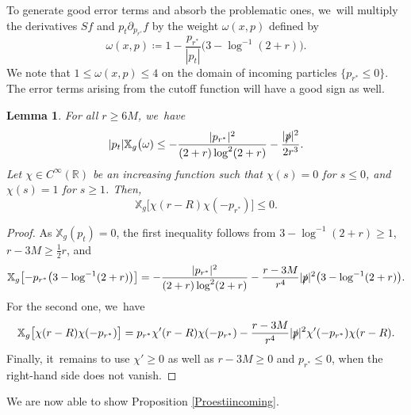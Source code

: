 \documentclass[10pt]{amsart}
\theoremstyle{plain}
\newtheorem{lemma}[proposition]{Lemma}
\theoremstyle{definition}
\newcommand\R{{\mathbb{R}}}
\newcommand\T{{\mathbb{X}}}
\begin{document}
To generate good error terms and absorb the problematic ones, we~will multiply the derivatives $Sf$ and $p_t \partial_{p_{r^*}}f$ by the weight $\omega(x,p)$ defined by
\begin{equation}\label{eq:defomegafaraway}
\omega(x,p)\coloneqq 1-\frac{p_{r^*}}{|p_t|}\bigl(3- \log^{-1}(2+r) \bigr).
\end{equation}
We note that $1 \leq \omega(x,p) \leq 4$ on the domain of incoming particles $\{ p_{r^*} \leq 0 \}$. The error terms arising from the cutoff function will have a good sign as well.

\begin{lemma}\label{Lemtruc}
For all $r \geq 6M$, we~have
\[
|p_t| \T_g \bigl(\omega)\leq -\frac{|p_{r^*}|^2}{(2+r) \log^2(2+r)}-\frac{|\slashed{p}|^2}{2r^3}.
\]
Let $ \chi \in C^\infty (\R)$ be an increasing function such that $\chi (s)=0$ for $s \leq 0$, and $\chi(s) =1$ for $s \geq 1$. Then,
\[
\T_g \bigl[ \chi (r-R)\chi (-p_{r^*}) \bigr] \leq 0.
\]
\end{lemma}

\begin{proof}
As $\T_g(p_t)=0$, the first inequality follows from $3- \log^{-1}(2+r) \geq 1$, $r-3M \geq \frac{1}{2}r$, and
\[
\T_g \bigl[ -p_{r^*} \bigl(3- \log^{-1}(2+r) \bigr) \bigr]= -\frac{|p_{r^*}|^2}{(2+r) \log^2(2+r)}-\frac{r-3M}{r^4}|\slashed{p}|^2 \bigl(3- \log^{-1}(2+r)\bigr).
\]
For the second one, we~have
\[
\T_g \bigl[ \chi (r-R)\chi (-p_{r^*}) \bigr]=p_{r^*} \chi'(r-R)\chi (-p_{r^*})-\frac{r-3M}{r^4} |\slashed{p}|^2 \chi'(-p_{r^*})\chi (r-R).
\]
Finally, it~remains to use $ \chi' \geq 0$ as well as $r-3M \geq 0$ and $p_{r^*} \leq 0$, when the right-hand side does not vanish.
\end{proof}

We are now able to show Proposition \ref{Proestiincoming}.
\end{document}
